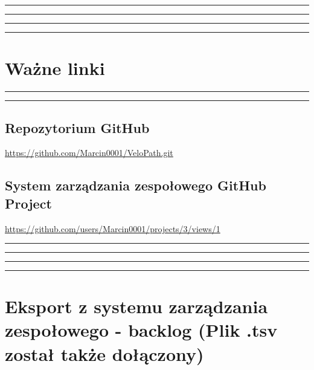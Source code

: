 \documentclass[12pt]{article}
\begin{document}
\vspace{0.5cm}\hrule\vspace{0.1cm}\hrule\vspace{0.1cm}\hrule\vspace{0.1cm}\hrule

\section*{Ważne linki}

\hrule\vspace{0.1cm}\hrule\vspace{0.3cm}

\subsection*{Repozytorium GitHub}
\href{https://github.com/Marcin0001/VeloPath.git}{https://github.com/Marcin0001/VeloPath.git}

\subsection*{System zarządzania zespołowego GitHub Project}
\href{https://github.com/users/Marcin0001/projects/3/views/1}{https://github.com/users/Marcin0001/projects/3/views/1}

\vspace{0.5cm}\hrule\vspace{0.1cm}\hrule\vspace{0.1cm}\hrule\vspace{0.1cm}\hrule

\section*{Eksport z systemu zarządzania zespołowego - backlog (Plik .tsv został także dołączony)}

\end{document}

